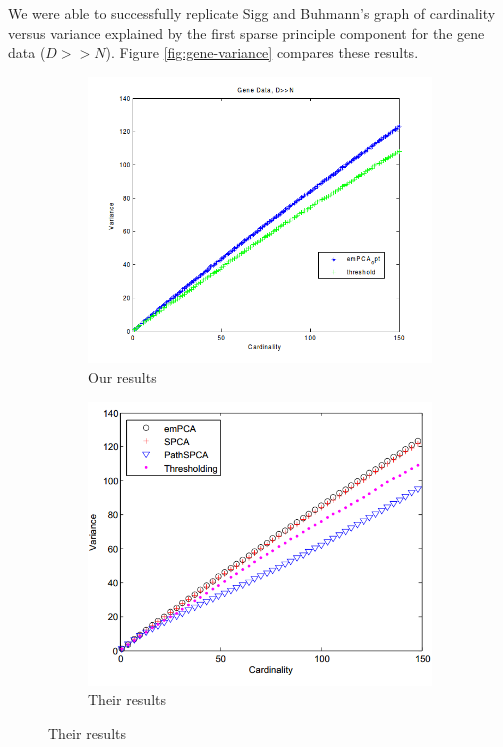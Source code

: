 \documentclass{article}
\begin{document}
We were able to successfully replicate Sigg and Buhmann's graph of
cardinality versus variance explained by the first sparse
principle component for the gene data ($D >> N$).
Figure \ref{fig:gene-variance} compares these results.

\begin{figure}[H,width=\textwidth]
\caption{Variance versus cardinality for gene data}
\label{fig:gene-variance}
\begin{subfigure}{0.5\textwidth}
\caption{Our results}
\includegraphics[width=\textwidth]{2.png}
\end{subfigure}
\begin{subfigure}{0.5\textwidth}
\caption{Their results}
\includegraphics[width=\textwidth]{1.png}
\end{subfigure}
\end{figure}
\end{document}
